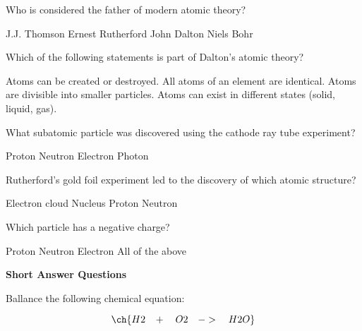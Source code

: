 \documentclass{exam}
\begin{document}
\begin{center}
\end{center}





\begin{questions}
    
\question[2] Who is considered the father of modern atomic theory?
\begin{checkboxes}
    \choice J.J. Thomson 
    \choice Ernest Rutherford
    \choice John Dalton 
    \choice Niels Bohr 
\end{checkboxes}


\question[2] Which of the following statements is part of Dalton's atomic theory?
\begin{checkboxes}
    \choice Atoms can be created or destroyed.  
    \choice All atoms of an element are identical.  
    \choice Atoms are divisible into smaller particles.  
    \choice Atoms can exist in different states (solid, liquid, gas). 
\end{checkboxes}



\question[2] What subatomic particle was discovered using the cathode ray tube experiment?
\begin{checkboxes}
    \choice Proton  
    \choice Neutron  
    \choice Electron  
    \choice Photon 
\end{checkboxes}

\question[2] Rutherford's gold foil experiment led to the discovery of which atomic structure?  
\begin{checkboxes}
    \choice Electron cloud  
    \choice Nucleus  
    \choice Proton  
    \choice Neutron  
\end{checkboxes}

\question[2] Which particle has a negative charge?
\begin{checkboxes}
    \choice Proton  
    \choice Neutron  
    \choice Electron  
    \choice All of the above  
\end{checkboxes}  



\textbf{Short Answer Questions}

\question[5] Ballance the following chemical equation:

\begin{equation}
    \ch{ H2 \;\;\;  +  \quad  O2 \quad ->  \quad H2O}
\end{equation}


\end{questions}
\end{document}
